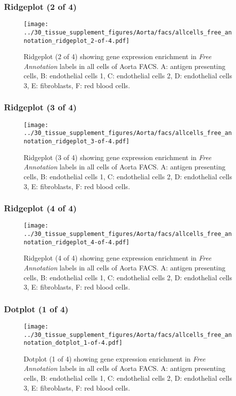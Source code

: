 \clearpage

\subsubsection{Ridgeplot (2 of 4)}
\begin{figure}[h]
\centering
\texttt{[image: ../30\_tissue\_supplement\_figures/Aorta/facs/allcells\_free\_annotation\_ridgeplot\_2-of-4.pdf]}

\caption{ Ridgeplot (2 of 4)  showing gene expression enrichment in \emph{Free Annotation} labels in all cells of Aorta FACS. A: antigen presenting cells, B: endothelial cells 1, C: endothelial cells 2, D: endothelial cells 3, E: fibroblasts, F: red blood cells.}
\end{figure}


\clearpage

\subsubsection{Ridgeplot (3 of 4)}
\begin{figure}[h]
\centering
\texttt{[image: ../30\_tissue\_supplement\_figures/Aorta/facs/allcells\_free\_annotation\_ridgeplot\_3-of-4.pdf]}

\caption{ Ridgeplot (3 of 4)  showing gene expression enrichment in \emph{Free Annotation} labels in all cells of Aorta FACS. A: antigen presenting cells, B: endothelial cells 1, C: endothelial cells 2, D: endothelial cells 3, E: fibroblasts, F: red blood cells.}
\end{figure}


\clearpage

\subsubsection{Ridgeplot (4 of 4)}
\begin{figure}[h]
\centering
\texttt{[image: ../30\_tissue\_supplement\_figures/Aorta/facs/allcells\_free\_annotation\_ridgeplot\_4-of-4.pdf]}

\caption{ Ridgeplot (4 of 4)  showing gene expression enrichment in \emph{Free Annotation} labels in all cells of Aorta FACS. A: antigen presenting cells, B: endothelial cells 1, C: endothelial cells 2, D: endothelial cells 3, E: fibroblasts, F: red blood cells.}
\end{figure}


\clearpage

\subsubsection{Dotplot (1 of 4)}
\begin{figure}[h]
\centering
\texttt{[image: ../30\_tissue\_supplement\_figures/Aorta/facs/allcells\_free\_annotation\_dotplot\_1-of-4.pdf]}

\caption{ Dotplot (1 of 4)  showing gene expression enrichment in \emph{Free Annotation} labels in all cells of Aorta FACS. A: antigen presenting cells, B: endothelial cells 1, C: endothelial cells 2, D: endothelial cells 3, E: fibroblasts, F: red blood cells.}
\end{figure}



